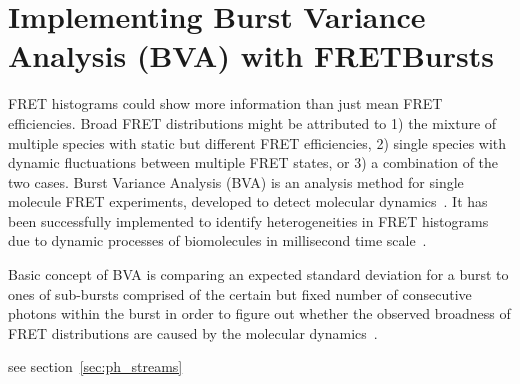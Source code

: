 \section{Implementing Burst Variance Analysis (BVA) with FRETBursts}

FRET histograms could show more information than just mean FRET efficiencies. Broad FRET distributions might be attributed to 1) the mixture of multiple species with static but different FRET efficiencies, 2) single species with dynamic fluctuations between multiple FRET states, or 3) a combination of the two cases. Burst Variance Analysis (BVA) is an analysis method for single molecule FRET experiments, developed to detect molecular dynamics~\cite{Torella_2011}. It has been successfully implemented to identify heterogeneities in FRET histograms due to dynamic processes of biomolecules in millisecond time scale~\cite{Torella_2011, Robb_2013}.

Basic concept of BVA is comparing an expected standard deviation for a burst to ones of sub-bursts comprised of the certain but fixed number of consecutive photons within the burst in order to figure out whether the observed broadness of FRET distributions are caused by the molecular dynamics~\cite{Torella_2011}. 

see section~\ref{sec:ph_streams}